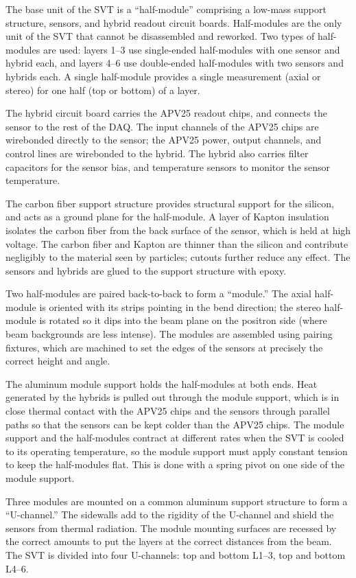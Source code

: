 The base unit of the SVT is a ``half-module'' comprising a low-mass support structure, sensors, and hybrid readout circuit boards.
Half-modules are the only unit of the SVT that cannot be disassembled and reworked.
Two types of half-modules are used: layers 1--3 use single-ended half-modules with one sensor and hybrid each, and layers 4--6 use double-ended half-modules with two sensors and hybrids each.
A single half-module provides a single measurement (axial or stereo) for one half (top or bottom) of a layer.

The hybrid circuit board carries the APV25 readout chips, and connects the sensor to the rest of the DAQ.
The input channels of the APV25 chips are wirebonded directly to the sensor; the APV25 power, output channels, and control lines are wirebonded to the hybrid.
The hybrid also carries filter capacitors for the sensor bias, and temperature sensors to monitor the sensor temperature.

The carbon fiber support structure provides structural support for the silicon, and acts as a ground plane for the half-module.
A layer of Kapton insulation isolates the carbon fiber from the back surface of the sensor, which is held at high voltage.
The carbon fiber and Kapton are thinner than the silicon and contribute negligibly to the material seen by particles; cutouts further reduce any effect.
The sensors and hybrids are glued to the support structure with epoxy.

Two half-modules are paired back-to-back to form a ``module.''
The axial half-module is oriented with its strips pointing in the bend direction; the stereo half-module is rotated so it dips into the beam plane on the positron side (where beam backgrounds are less intense).
The modules are assembled using pairing fixtures, which are machined to set the edges of the sensors at precisely the correct height and angle.

The aluminum module support holds the half-modules at both ends.
Heat generated by the hybrids is pulled out through the module support, which is in close thermal contact with the APV25 chips and the sensors through parallel paths so that the sensors can be kept colder than the APV25 chips.
The module support and the half-modules contract at different rates when the SVT is cooled to its operating temperature, so the module support must apply constant tension to keep the half-modules flat.
This is done with a spring pivot on one side of the module support.

Three modules are mounted on a common aluminum support structure to form a ``U-channel.''
The sidewalls add to the rigidity of the U-channel and shield the sensors from thermal radiation.
The module mounting surfaces are recessed by the correct amounts to put the layers at the correct distances from the beam.
The SVT is divided into four U-channels: top and bottom L1--3, top and bottom L4--6.

